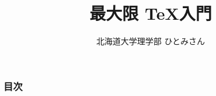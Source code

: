 
\newcommand{\centeralign}[1]{\rule{0pt}{0pt}\hfill#1\hfill\rule{0pt}{0pt}}
\newcommand{\typecommand}[1]{\colorbox{darkgray}{{\ttfamily\color{lime}#1}}}

\setlength{\parskip}{2ex}

\title{最大限 \TeX 入門}
\author{北海道大学理学部 ひとみさん}
\date{\warekitoday}



\frame{\maketitle}

\begin{frame}
	\frametitle{目次}
	\setlength{\parskip}{0.5ex}
	\tableofcontents
\end{frame}

